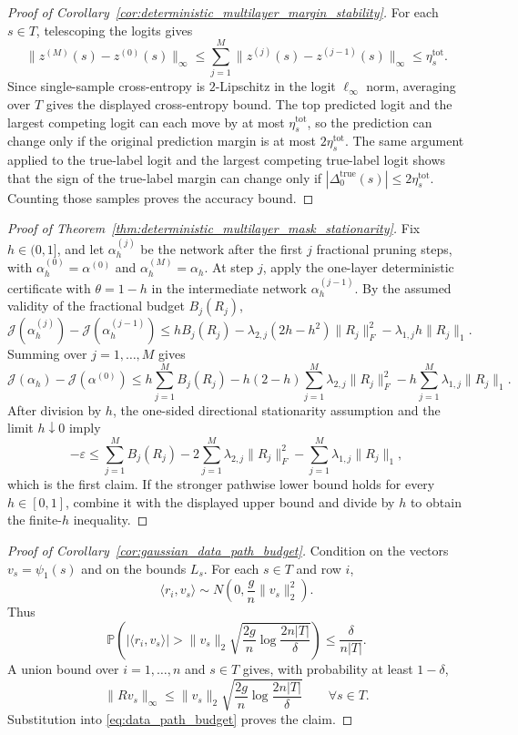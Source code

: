 \documentclass[11pt]{article}
\theoremstyle{plain}
\theoremstyle{definition}
\theoremstyle{remark}
\newcommand{\PP}{\mathbb{P}}
\newcommand{\1}{\mathbf{1}}
\begin{document}
\begin{proof}[Proof of Corollary~\ref{cor:deterministic_multilayer_margin_stability}]
For each \(s\in T\), telescoping the logits gives
\[
\|z^{(M)}(s)-z^{(0)}(s)\|_\infty
\le
\sum_{j=1}^M\|z^{(j)}(s)-z^{(j-1)}(s)\|_\infty
\le
\eta_s^{\mathrm{tot}}.
\]
Since single-sample cross-entropy is \(2\)-Lipschitz in the logit \(\ell_\infty\) norm, averaging over \(T\) gives the displayed cross-entropy bound. The top predicted logit and the largest competing logit can each move by at most \(\eta_s^{\mathrm{tot}}\), so the prediction can change only if the original prediction margin is at most \(2\eta_s^{\mathrm{tot}}\). The same argument applied to the true-label logit and the largest competing true-label logit shows that the sign of the true-label margin can change only if \(|\Delta_0^{\mathrm{true}}(s)|\le2\eta_s^{\mathrm{tot}}\). Counting those samples proves the accuracy bound.
\end{proof}

\begin{proof}[Proof of Theorem~\ref{thm:deterministic_multilayer_mask_stationarity}]
Fix \(h\in(0,1]\), and let \(\alpha_h^{(j)}\) be the network after the first \(j\) fractional pruning steps, with \(\alpha_h^{(0)}=\alpha^{(0)}\) and \(\alpha_h^{(M)}=\alpha_h\). At step \(j\), apply the one-layer deterministic certificate with \(\theta=1-h\) in the intermediate network \(\alpha_h^{(j-1)}\). By the assumed validity of the fractional budget \(B_j(R_j)\),
\[
\mathcal J(\alpha_h^{(j)})-\mathcal J(\alpha_h^{(j-1)})
\le
hB_j(R_j)
-\lambda_{2,j}(2h-h^2)\|R_j\|_F^2
-\lambda_{1,j}h\|R_j\|_1.
\]
Summing over \(j=1,\dots,M\) gives
\[
\mathcal J(\alpha_h)-\mathcal J(\alpha^{(0)})
\le
h\sum_{j=1}^M B_j(R_j)
-h(2-h)\sum_{j=1}^M\lambda_{2,j}\|R_j\|_F^2
-h\sum_{j=1}^M\lambda_{1,j}\|R_j\|_1.
\]
After division by \(h\), the one-sided directional stationarity assumption and the limit \(h\downarrow0\) imply
\[
-\varepsilon
\le
\sum_{j=1}^M B_j(R_j)
-2\sum_{j=1}^M\lambda_{2,j}\|R_j\|_F^2
-\sum_{j=1}^M\lambda_{1,j}\|R_j\|_1,
\]
which is the first claim. If the stronger pathwise lower bound holds for every \(h\in[0,1]\), combine it with the displayed upper bound and divide by \(h\) to obtain the finite-\(h\) inequality.
\end{proof}

\begin{proof}[Proof of Corollary~\ref{cor:gaussian_data_path_budget}]
Condition on the vectors \(v_s=\psi_1(s)\) and on the bounds \(L_s\). For each \(s\in T\) and row \(i\),
\[
\langle r_i,v_s\rangle\sim N\!\left(0,\frac{g}{n}\|v_s\|_2^2\right).
\]
Thus
\[
\PP\!\left(
|\langle r_i,v_s\rangle|
>
\|v_s\|_2\sqrt{\frac{2g}{n}\log\frac{2n|T|}{\delta}}
\right)
\le
\frac{\delta}{n|T|}.
\]
A union bound over \(i=1,\dots,n\) and \(s\in T\) gives, with probability at least \(1-\delta\),
\[
\|Rv_s\|_\infty
\le
\|v_s\|_2\sqrt{\frac{2g}{n}\log\frac{2n|T|}{\delta}}
\qquad\forall s\in T.
\]
Substitution into \eqref{eq:data_path_budget} proves the claim.
\end{proof}
\end{document}

